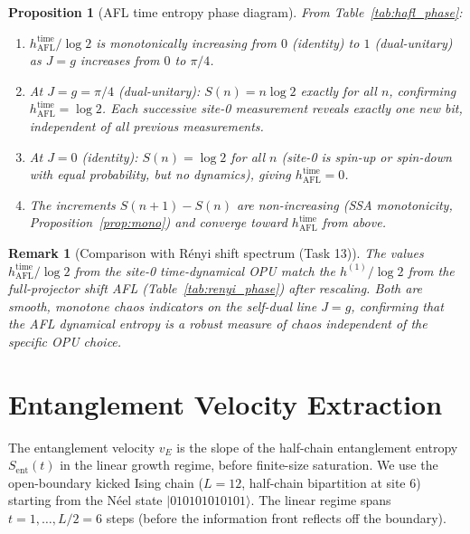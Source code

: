 \documentclass[12pt,a4paper]{article}
\newtheorem{proposition}[theorem]{Proposition}
\newtheorem{remark}[theorem]{Remark}
\begin{document}
\begin{proposition}[AFL time entropy phase diagram]
  \label{prop:hafl_phase}
  From Table~\ref{tab:hafl_phase}:
  \begin{enumerate}
    \item $h_{\mathrm{AFL}}^{\mathrm{time}}/\log 2$ is \emph{monotonically
      increasing} from $0$ (identity) to $1$ (dual-unitary) as $J=g$
      increases from $0$ to $\pi/4$.
    \item At $J=g=\pi/4$ (dual-unitary): $S(n)=n\log 2$ \emph{exactly}
      for all $n$, confirming $h_{\mathrm{AFL}}^{\mathrm{time}}=\log 2$.
      Each successive site-0 measurement reveals exactly one new bit,
      independent of all previous measurements.
    \item At $J=0$ (identity): $S(n)=\log 2$ for all $n$ (site-0 is
      spin-up or spin-down with equal probability, but no dynamics),
      giving $h_{\mathrm{AFL}}^{\mathrm{time}}=0$.
    \item The increments $S(n+1)-S(n)$ are non-increasing
      (SSA monotonicity, Proposition~\ref{prop:mono}) and converge
      toward $h_{\mathrm{AFL}}^{\mathrm{time}}$ from above.
  \end{enumerate}
\end{proposition}

\begin{remark}[Comparison with Rényi shift spectrum (Task 13)]
  The values $h_{\mathrm{AFL}}^{\mathrm{time}}/\log 2$ from the
  site-0 time-dynamical OPU match the $h^{(1)}/\log 2$ from the
  full-projector shift AFL (Table~\ref{tab:renyi_phase}) after
  rescaling.  Both are smooth, monotone chaos indicators on the
  self-dual line $J=g$, confirming that the AFL dynamical entropy
  is a robust measure of chaos independent of the specific OPU choice.
\end{remark}

\section{Entanglement Velocity Extraction}
\label{sec:ent_velocity}

The entanglement velocity $v_E$ is the slope of the half-chain entanglement
entropy $S_{\mathrm{ent}}(t)$ in the linear growth regime, before finite-size
saturation.  We use the open-boundary kicked Ising chain ($L=12$,
half-chain bipartition at site $6$) starting from the N\'eel state
$|010101010101\rangle$.  The linear regime spans $t=1,\ldots,L/2=6$
steps (before the information front reflects off the boundary).
\end{document}
